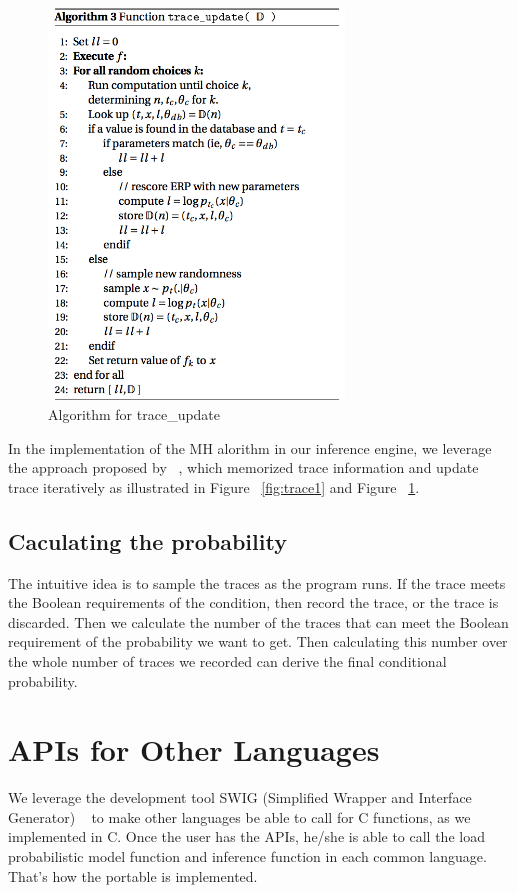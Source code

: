 \begin{figure}
    \centering
    \includegraphics[width=0.7\textwidth]{figures/trace2.png}
    \caption{Algorithm for trace\_update}
    \label{fig:trace2}
\end{figure}

In the implementation of the MH alorithm in our inference engine, we leverage the approach proposed by ~\cite{lightweight}, which memorized trace information and update trace iteratively as illustrated in Figure ~\ref{fig:trace1} and Figure ~\ref{fig:trace2}. 

\subsection{Caculating the probability}
The intuitive idea is to sample the traces as the program runs. If the trace meets the Boolean requirements of the condition, then record the trace, or the trace is discarded. Then we calculate the number of the traces that can meet the Boolean requirement of the probability we want to get. Then calculating this number over the whole number of traces we recorded can derive the final conditional probability.

\section{APIs for Other Languages}
\label{sec:api}
We leverage the development tool SWIG (Simplified Wrapper and Interface Generator) ~\cite{swig} to make other languages be able to call for C functions, as we implemented in C. Once the user has the APIs, he/she is able to call the load probabilistic model function and inference function in each common language. That's how the portable is implemented. 

